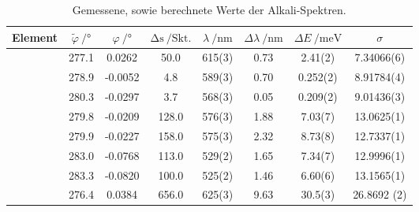 \begin{table}
\centering
\begin{tabular}{S  S[table-format=3.1] S[table-format=1.4] S[table-format=3.1] S[table-format=1.0(1)] S[table-format=1.0] S[table-format=1.3(1)] S[table-format=1.5(1)] }
\toprule
{Element} & {$\tilde{\varphi}\:/\si\degree$} & {$\varphi\:/\si\degree$} & {$\mathup{\Delta{s}}\:/\mathup{Skt.}$}& {$\lambda\:/\si{\nano\meter}$} & {$\Delta{\lambda}\:/\si{\nano\meter}$}&{$\Delta{E}\:/\si{\milli}\mathup{e}\si\volt$}&{$\sigma$}\\
\midrule
{}  & 277.1 &  0.0262 &  50.0 & 615(3) & 0.73 &  2.41(2)    &   7.34066(6)  \\
           & 278.9 & -0.0052 &   4.8 & 589(3) & 0.70 &  0.252(2)   &   8.91784(4)  \\
           & 280.3 & -0.0297 &   3.7 & 568(3) & 0.05 &  0.209(2)   &   9.01436(3)  \\
  & 279.8 & -0.0209 & 128.0 & 576(3) & 1.88 &  7.03(7)    &  13.0625(1)    \\
           & 279.9 & -0.0227 & 158.0 & 575(3) & 2.32 &  8.73(8)    &  12.7337(1)  \\
           & 283.0 & -0.0768 & 113.0 & 529(2) & 1.65 &  7.34(7)    &  12.9996(1)  \\
           & 283.3 & -0.0820 & 100.0 & 525(2) & 1.46 &  6.60(6)    &  13.1565(1)    \\
  & 276.4 &  0.0384 & 656.0 & 625(3) & 9.63 & 30.5(3)     &  26.8692 (2)   \\
\bottomrule
\end{tabular}
\caption{Gemessene, sowie berechnete Werte der Alkali-Spektren.}
\label{tab:spektren}
\end{table}


